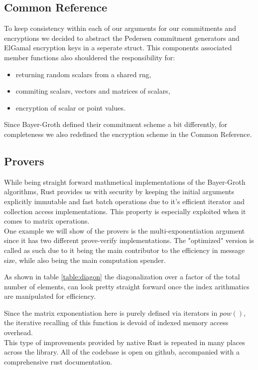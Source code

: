 \documentclass[12pt,a4paper]{report}
\begin{document}
\subsection*{Common Reference}
To keep consistency within each of our arguments for our commitments and encryptions we decided to abstract 
the Pedersen commitment generators and ElGamal encryption keys in a seperate struct. This components associated
member functions also shouldered the responsibility for: 
\begin{itemize}
	\item returning random scalars from a shared rng, 
	\item commiting scalars, vectors and matrices of scalars, 
	\item encryption of scalar or point values.
\end{itemize}
Since Bayer-Groth defined their commitment scheme a bit differently, for completeness we also redefined 
the encryption scheme in the Common Reference.

\subsection*{Provers}
While being straight forward mathmetical implementations of the Bayer-Groth algorithms, Rust provides us with
security by keeping the initial arguments explicitly immutable and fast batch operations due to it's efficient
iterator and collection access implementations.
This property is especially exploited when it comes to matrix operations.\\
One example we will show of the provers is the multi-exponentiation argument since it has two different prove-verify
implementations. The "optimized" version is called as such due to it being the main contributor to the efficiency in message size,
while also being the main computation spender.

As shown in table \ref{table:diagon} the diagonalization over a factor of the total number of elements,
can look pretty straight forward once the index arithmatics are manipulated for efficiency.

Since the matrix exponentiation here is purely defined via iterators in $pow()$, 
the iterative recalling of this function is devoid of indexed memory access overhead.\\

This type of improvements provided by native Rust is repeated in many places across the library.
All of the codebase is open on github\cite{repo}, accompanied with a comprehensive rust documentation.
\end{document}
